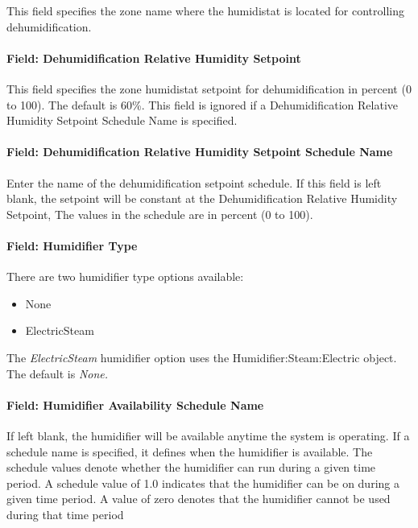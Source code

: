 This field specifies the zone name where the humidistat is located for controlling dehumidification.

\paragraph{Field: Dehumidification Relative Humidity Setpoint}\label{field-dehumidification-relative-humidity-setpoint-2}

This field specifies the zone humidistat setpoint for dehumidification in percent (0 to 100). The default is 60\%. This field is ignored if a Dehumidification Relative Humidity Setpoint Schedule Name is specified.

\paragraph{Field: Dehumidification Relative Humidity Setpoint Schedule Name}\label{field-dehumidification-relative-humidity-setpoint-schedule-name-2}

Enter the name of the dehumidification setpoint schedule. If this field is left blank, the setpoint will be constant at the Dehumidification Relative Humidity Setpoint, The values in the schedule are in percent (0 to 100).

\paragraph{Field: Humidifier Type}\label{field-humidifier-type-6}

There are two humidifier type options available:

\begin{itemize}
\item
  None
\item
  ElectricSteam
\end{itemize}

The \emph{ElectricSteam} humidifier option uses the Humidifier:Steam:Electric object. The default is \emph{None.}

\paragraph{Field: Humidifier Availability Schedule Name}\label{field-humidifier-availability-schedule-name-6}

If left blank, the humidifier will be available anytime the system is operating. If a schedule name is specified, it defines when the humidifier is available. The schedule values denote whether the humidifier can run during a given time period. A schedule value of 1.0 indicates that the humidifier can be on during a given time period. A value of zero denotes that the humidifier cannot be used during that time period

